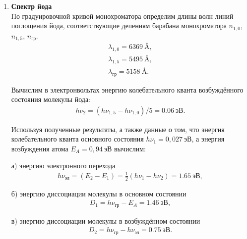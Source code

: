 \begin{enumerate}
\item
\textbf{Спектр йода}\\
По градуировочной кривой монохроматора определим длины волн линий поглощения йода, соответствующие делениям барабана монохроматора $n_{1,0}$, $n_{1,5}$, $n_{\text{гр}}$.
\begin{gather*}
\lambda_{1,0} = 6369~\text{\AA},\\
\lambda_{1,5} = 5495~\text{\AA},\\
\lambda_{\text{гр}} = 5158~\text{\AA}.
\end{gather*}

Вычислим в электронвольтах энергию колебательного кванта возбуждённого состояния молекулы йода:
\begin{gather*}
h\nu_2 = (h\nu_{1,5} - h\nu_{1,0})/5 = 0.06~\text{эВ}.
\end{gather*}

Используя полученные результаты, а также данные о том, что энергия колебательного кванта основного состояния $h\nu_1 = 0,027~\text{эВ}$, а энергия возбуждения атома $E_A = 0,94~\text{эВ}$ вычислим:

а) энергию электронного перехода 
\begin{gather*}
h\nu_{\text{эл}} = (E_2 - E_1) = \frac{1}{2}(h\nu_1 - h\nu_2) = 1.65~\text{эВ},
\end{gather*}

б) энергию диссоциации молекулы в основном состоянии
\begin{gather*}
D_1 = h\nu_{\text{гр}} - E_A = 1.46~\text{эВ},
\end{gather*}

в) энергию диссоциации молекулы в возбуждённом состоянии \begin{gather*}
D_2 = h\nu_{\text{гр}} - h\nu_{\text{эл}} = 0.75~\text{эВ}.
\end{gather*}

\begin{figure}[h]
\end{figure}

\end{enumerate}


